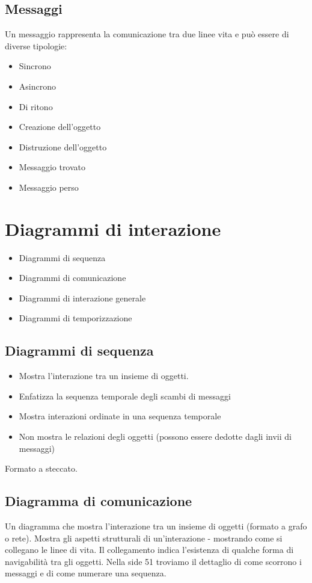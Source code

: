 \subsection{Messaggi}
Un messaggio rappresenta la comunicazione tra due linee vita e può essere di diverse
tipologie:
\begin{itemize}
    \item Sincrono
    \item Asincrono
    \item Di ritono
    \item Creazione dell'oggetto
    \item Distruzione dell'oggetto
    \item Messaggio trovato
    \item Messaggio perso
\end{itemize}
\section{Diagrammi di interazione}
\begin{itemize}
    \item Diagrammi di sequenza
    \item Diagrammi di comunicazione
    \item Diagrammi di interazione generale
    \item Diagrammi di temporizzazione
\end{itemize}
\subsection{Diagrammi di sequenza}
\begin{itemize}
    \item Mostra l'interazione tra un insieme di oggetti.
    \item Enfatizza la sequenza temporale degli scambi di messaggi
    \item Mostra interazioni ordinate in una sequenza temporale
    \item Non mostra le relazioni degli oggetti (possono essere dedotte dagli invii di messaggi)
\end{itemize}
Formato a steccato.
\subsection{Diagramma di comunicazione}
Un diagramma che mostra l'interazione tra un insieme di oggetti (formato a grafo o rete).
Mostra gli aspetti strutturali di un'interazione - mostrando come si collegano le linee
di vita. Il collegamento indica l'esistenza di qualche forma di navigabilità tra gli oggetti.
Nella side 51 troviamo il dettaglio di come scorrono i messaggi e di come numerare una sequenza.
